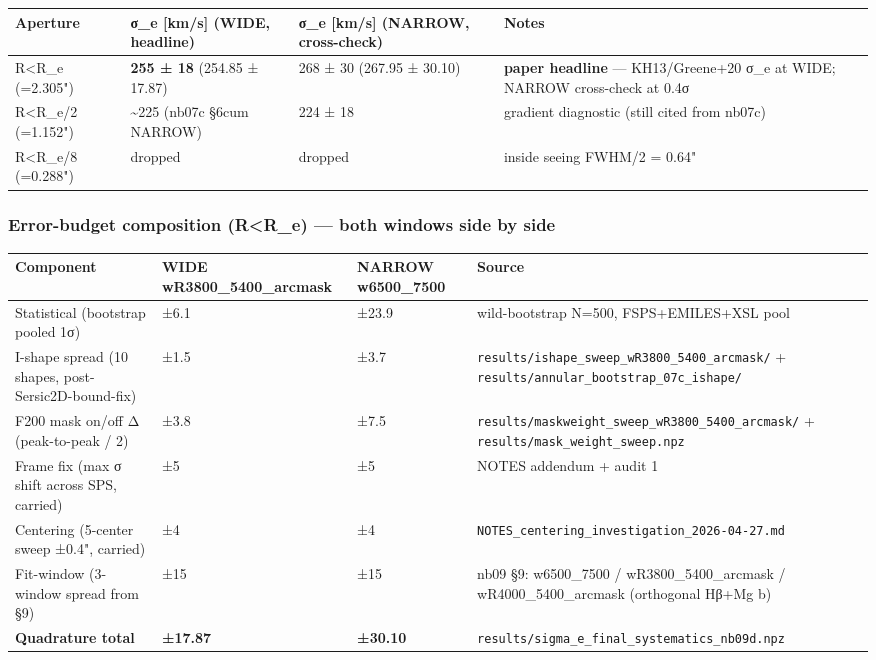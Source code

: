 \documentclass[
  10pt,
]{article}
\begin{document}
\begingroup\small\setlength{\tabcolsep}{4pt}\begin{longtable}[]{@{}llll@{}}
\toprule
Aperture & σ\_e {[}km/s{]} (WIDE, headline) & σ\_e {[}km/s{]} (NARROW, cross-check) & Notes \\
\midrule
\endhead
R\textless R\_e (=2.305") & \textbf{255 ± 18} (254.85 ± 17.87) & 268 ± 30 (267.95 ± 30.10) & \textbf{paper headline} --- KH13/Greene+20 σ\_e at WIDE; NARROW cross-check at 0.4σ \\
R\textless R\_e/2 (=1.152") & \textasciitilde225 (nb07c §6cum NARROW) & 224 ± 18 & gradient diagnostic (still cited from nb07c) \\
R\textless R\_e/8 (=0.288") & dropped & dropped & inside seeing FWHM/2 = 0.64" \\
\bottomrule
\end{longtable}\endgroup

\hypertarget{error-budget-composition-rr_e-both-windows-side-by-side}{%
\subsubsection{Error-budget composition (R\textless R\_e) --- both windows side by side}\label{error-budget-composition-rr_e-both-windows-side-by-side}}

\begingroup\small\setlength{\tabcolsep}{4pt}\begin{longtable}[]{@{}llll@{}}
\toprule
Component & WIDE wR3800\_5400\_arcmask & NARROW w6500\_7500 & Source \\
\midrule
\endhead
Statistical (bootstrap pooled 1σ) & ±6.1 & ±23.9 & wild-bootstrap N=500, FSPS+EMILES+XSL pool \\
I-shape spread (10 shapes, post-Sersic2D-bound-fix) & ±1.5 & ±3.7 & \texttt{results/ishape\_sweep\_wR3800\_5400\_arcmask/} + \texttt{results/annular\_bootstrap\_07c\_ishape/} \\
F200 mask on/off Δ (peak-to-peak / 2) & ±3.8 & ±7.5 & \texttt{results/maskweight\_sweep\_wR3800\_5400\_arcmask/} + \texttt{results/mask\_weight\_sweep.npz} \\
Frame fix (max σ shift across SPS, carried) & ±5 & ±5 & NOTES addendum + audit 1 \\
Centering (5-center sweep ±0.4", carried) & ±4 & ±4 & \texttt{NOTES\_centering\_investigation\_2026-04-27.md} \\
Fit-window (3-window spread from §9) & ±15 & ±15 & nb09 §9: w6500\_7500 / wR3800\_5400\_arcmask / wR4000\_5400\_arcmask (orthogonal Hβ+Mg b) \\
\textbf{Quadrature total} & \textbf{±17.87} & \textbf{±30.10} & \texttt{results/sigma\_e\_final\_systematics\_nb09d.npz} \\
\bottomrule
\end{longtable}\endgroup
\end{document}
